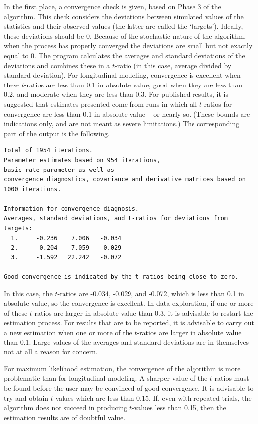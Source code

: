 \documentclass[a4paper,fleqn]{article}
\newcommand{\+}{\, + \,}
\begin{document}
{In the first place, a
\hypertarget{T_convergence}{convergence check}
is given, based on Phase 3 of the algorithm. This check
considers the deviations between simulated values of the
statistics and their observed values (the latter are called the
`targets'). Ideally, these deviations should be 0. Because of the
stochastic nature of the algorithm, when the process has properly
converged the deviations are small but not exactly equal to 0.
The program calculates the averages and standard deviations of the
deviations and combines these in a $t$-ratio (in this case,
average divided by standard deviation). For longitudinal modeling,
convergence is excellent when these $t$-ratios are less than 0.1
in absolute value, good when they are less than 0.2, and
moderate when they are less than 0.3.
For published results, it is suggested that estimates presented come from runs
in which all $t$-ratios for convergence are less than 0.1 in absolute value
-- or nearly so.
(These bounds are indications only, and
are not meant as severe limitations.)
The corresponding part
of the output is the following.

{\footnotesize
\begin{verbatim}
Total of 1954 iterations.
Parameter estimates based on 954 iterations,
basic rate parameter as well as
convergence diagnostics, covariance and derivative matrices based on 1000 iterations.

Information for convergence diagnosis.
Averages, standard deviations, and t-ratios for deviations from targets:
  1.     -0.236    7.006   -0.034
  2.      0.204    7.059    0.029
  3.     -1.592   22.242   -0.072

Good convergence is indicated by the t-ratios being close to zero.
\end{verbatim}
}

In this case, the $t$-ratios are -0.034, -0.029, and -0.072,
which is less than 0.1 in absolute value, so the convergence is
excellent. In data exploration, if one or more of these
$t$-ratios are larger in absolute value than 0.3, it is
advisable to restart the estimation process. For results that are
to be reported, it is advisable to carry out a new estimation when
one or more of the $t$-ratios are larger in absolute value
than 0.1. Large values of the averages and standard deviations are
in themselves not at all a reason for concern.

For maximum likelihood estimation, the convergence
of the algorithm is more problematic than for longitudinal
modeling. A sharper value of the $t$-ratios must be found
before the user may be convinced of good convergence. It is
advisable to try and obtain $t$-values which are less than 0.15.
If, even with repeated trials, the algorithm does not succeed in
producing $t$-values less than 0.15, then the estimation results
are of doubtful value.
\medskip

}
\end{document}
